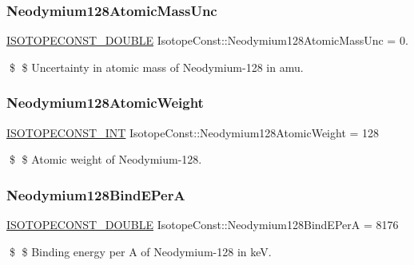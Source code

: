 \subsubsection{\texorpdfstring{Neodymium128\+Atomic\+Mass\+Unc}{Neodymium128AtomicMassUnc}}
{\footnotesize\ttfamily \mbox{\hyperlink{group___isotope_const-_macros_ga8f45a7272ce02c0b4c65c44636ed719a}{I\+S\+O\+T\+O\+P\+E\+C\+O\+N\+S\+T\+\_\+\+D\+O\+U\+B\+LE}} Isotope\+Const\+::\+Neodymium128\+Atomic\+Mass\+Unc = 0.}

\$ \$ Uncertainty in atomic mass of Neodymium-\/128 in amu. \mbox{\label{group___isotope_const-_neodymium-_nd128_ga41d161b20256e7f86a8e2bdfab8b71ba}} 
\subsubsection{\texorpdfstring{Neodymium128\+Atomic\+Weight}{Neodymium128AtomicWeight}}
{\footnotesize\ttfamily \mbox{\hyperlink{group___isotope_const-_macros_ga5f18360b3e99483a35c32d789e62621c}{I\+S\+O\+T\+O\+P\+E\+C\+O\+N\+S\+T\+\_\+\+I\+NT}} Isotope\+Const\+::\+Neodymium128\+Atomic\+Weight = 128}

\$ \$ Atomic weight of Neodymium-\/128. \mbox{\label{group___isotope_const-_neodymium-_nd128_gaabc2f3d2063e3379255cd84d8231ae7e}} 
\subsubsection{\texorpdfstring{Neodymium128\+Bind\+E\+PerA}{Neodymium128BindEPerA}}
{\footnotesize\ttfamily \mbox{\hyperlink{group___isotope_const-_macros_ga8f45a7272ce02c0b4c65c44636ed719a}{I\+S\+O\+T\+O\+P\+E\+C\+O\+N\+S\+T\+\_\+\+D\+O\+U\+B\+LE}} Isotope\+Const\+::\+Neodymium128\+Bind\+E\+PerA = 8176}

\$ \$ Binding energy per A of Neodymium-\/128 in keV. \mbox{\label{group___isotope_const-_neodymium-_nd128_ga9466ed8ccb9a64ddd519e4d9e3f4350d}} 
